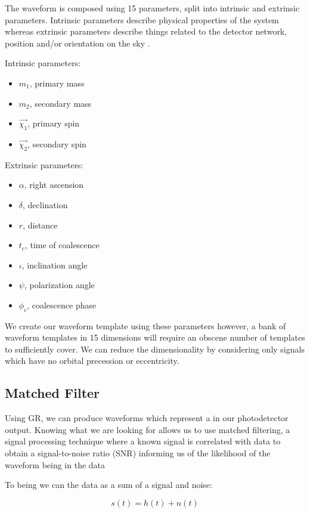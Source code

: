 The waveform is composed using 15 parameters, split into intrinsic and extrinsic parameters. Intrinsic parameters describe physical properties of the system whereas extrinsic parameters describe things related to the detector network, position and/or orientation on the sky \cite{BAYESTAR:2016}.

Intrinsic parameters:
\begin{itemize}
   \item $m_1$, primary mass
   \item $m_2$, secondary mass
   \item $\vec{\chi_1}$, primary spin
   \item $\vec{\chi_2}$, secondary spin
\end{itemize}

Extrinsic parameters:
\begin{itemize}
   \item $\alpha$, right ascension
   \item $\delta$, declination
   \item $r$, distance
   \item $t_c$, time of coalescence
   \item $\iota$, inclination angle
   \item $\psi$, polarization angle
   \item $\phi_c$, coalescence phase
\end{itemize}

We create our waveform template using these parameters however, a bank of waveform templates in 15 dimensions will require an obscene number of templates to sufficiently cover. We can reduce the dimensionality by considering only signals which have no orbital precession or eccentricity. 

\subsection{\label{2:sec:matched-filter}Matched Filter}

Using GR, we can produce waveforms which represent a \gw in our photodetector output. Knowing what we are looking for allows us to use matched filtering, a signal processing technique where a known signal is correlated with data to
obtain a signal-to-noise ratio (SNR) informing us of the likelihood of the waveform being in the data

To being we can the data as a sum of a signal and noise:

\begin{equation}
   s(t) = h(t) + n(t)
   \label{2:eqn:s_h_n}
\end{equation}

